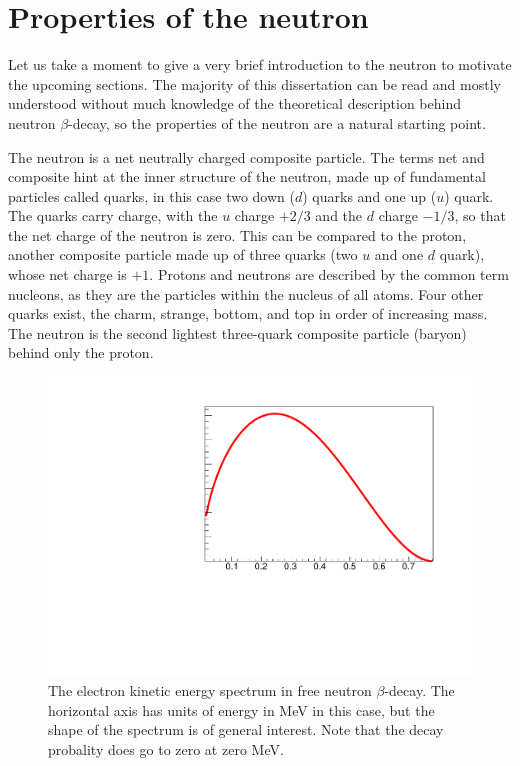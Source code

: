 \section{Properties of the neutron}
\label{sec:neutronProperties}
Let us take a moment to give a very brief introduction to the neutron to motivate the
upcoming sections. The majority of this dissertation can be read and mostly understood
without much knowledge of the theoretical description behind neutron $\beta$-decay,
so the properties of the neutron are a natural starting point.

The neutron is a net neutrally charged composite particle. The terms net and
composite hint at the inner structure of the neutron, made up of fundamental
particles called quarks, in this case two down ($d$) quarks and one up ($u$) quark.
The quarks carry charge, with the $u$ charge $+2/3$ and the $d$ charge
$-1/3$, so that the net charge of the neutron is zero. This can be compared
to the proton, another composite particle made up of three quarks (two $u$ and
one $d$ quark), whose net charge is $+1$. Protons and neutrons are described
by the common term nucleons, as they are the particles within the nucleus of all
atoms. Four other quarks exist,
the charm, strange, bottom, and top in order of increasing mass. The neutron
is the second lightest three-quark composite particle (baryon) 
behind only the proton.

\begin{figure}
  \centering
  \includegraphics[page=1,scale=0.4]{1-Introduction/betaSpectrum.pdf}
    \caption{The electron kinetic energy spectrum in free neutron $\beta$-decay. The horizontal
      axis has units of energy in MeV in this case, but the shape of the spectrum
      is of general interest. Note that the decay probality does go to zero at zero
      MeV.}
  \label{fig:betaSpectrum}
\end{figure}

